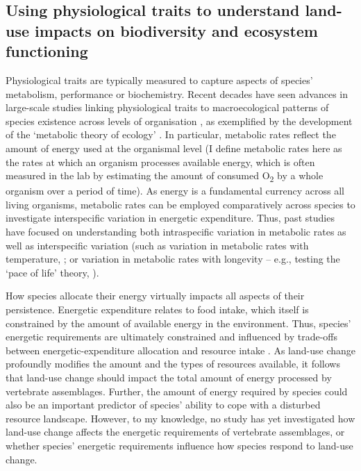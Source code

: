 \subsection{Using physiological traits to understand  land-use impacts on biodiversity and ecosystem functioning}

Physiological traits are typically measured to capture aspects of species' metabolism, performance or biochemistry. Recent decades have seen advances in large-scale studies linking physiological traits to macroecological patterns of species existence across levels of organisation \citep{Chown2004, RobertBurger2021}, as exemplified by the development of the `metabolic theory of ecology' \citep{Gillooly2001a, Brown2004a}. In particular, metabolic rates reflect the amount of energy used at the organismal level (I define metabolic rates here as the rates at which an organism processes available energy, which is often measured in the lab by estimating the amount of consumed O\textsubscript{2} by a whole organism over a period of time). As energy is a fundamental currency across all living organisms, metabolic rates can be employed comparatively across species to investigate interspecific variation in energetic expenditure. Thus, past studies have focused on understanding both intraspecific variation in metabolic rates \citep{Burton2011, Auer2017} as well as interspecific variation (such as variation in metabolic rates with temperature, \citet{Clarke2004a}; or variation in metabolic rates with longevity -- e.g., testing the `pace of life' theory, \citet{Stark2020}).

How species allocate their energy virtually impacts all aspects of their persistence. Energetic expenditure relates to food intake, which itself is constrained by the amount of available energy in the environment. Thus, species' energetic requirements are ultimately constrained and influenced by trade-offs between energetic-expenditure allocation and resource intake \citep{Auer2020}. As land-use change profoundly modifies the amount and the types of resources available, it follows that land-use change should impact the total amount of energy processed by vertebrate assemblages. Further, the amount of energy required by species could also be an important predictor of species' ability to cope with a disturbed resource landscape. However, to my knowledge, no study has yet investigated how land-use change affects the energetic requirements of vertebrate assemblages, or whether species' energetic requirements influence how species respond to land-use change.


